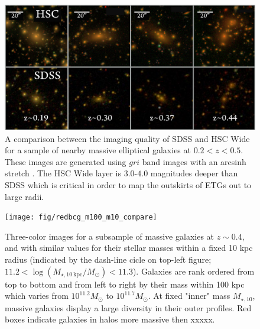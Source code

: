 \documentclass{emulateapj}
\begin{document}
\begin{CJK*}{UTF8}{gbsn}
    \begin{figure}[t!]
        \centering 
        \includegraphics[width=\textwidth]{fig/redbcg_sdss_compare}
        \caption{A comparison between the imaging quality of SDSS and HSC Wide for a sample 
        	of nearby massive elliptical galaxies at $0.2 < z < 0.5$.  
            These images are generated using $gri$ band images with an arcsinh stretch 
            \citep{Lupton2004}. 
            The HSC Wide layer is $3.0$-$4.0$ magnitudes deeper than SDSS which is 
            critical in order to map the outskirts of ETGs out to large radii.}
        \label{fig:sdss_compare}
    \end{figure}

  \begin{figure}[t!]
      \centering 
      \texttt{[image: fig/redbcg\_m100\_m10\_compare]}
      \caption{Three-color images for a subsample of massive galaxies at $z\sim 0.4$, and with similar values for their stellar masses within a fixed 10 kpc radius (indicated by the 
            dash-line cicle on top-left figure; 
            $11.2<\log (M_{\star,10\ \mathrm{kpc}}/M_{\odot})<11.3$). Galaxies are rank ordered from top to bottom and from left to right by their mass within 100 kpc which varies from $10^{11.2} M_{\odot}$ to $10^{11.7} M_{\odot}$. At fixed "inner" mass $M_{\star,10}$, massive galaxies display a large diversity in their outer profiles. Red boxes indicate galaxies in halos more massive then xxxxx. }
      \label{fig:m100_m10_color}
  \end{figure}


\end{CJK*}
\end{document}
